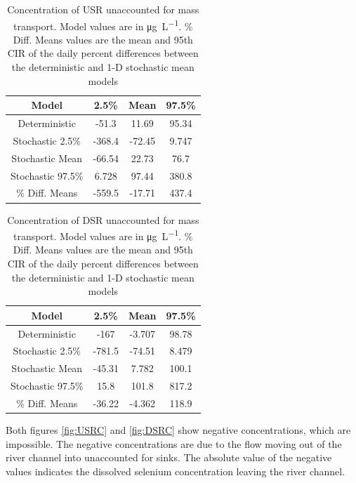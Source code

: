 \begin{linenumbers}
\begin{table}[htbp]
\centering
\caption[Concentration of USR unaccounted for mass transport.]{Concentration of USR unaccounted for mass transport.  Model values are in \si{\micro\gram\per\liter}.  \% Diff. Means values are the mean and 95th CIR of the daily percent differences between the deterministic and 1-D stochastic mean models}
\label{tab:USRUnknownC}
\begin{tabular}{c|ccc}
	\toprule
	Model& 2.5\% & Mean & 97.5\% \\
	\midrule
	\midrule
	Deterministic&		-51.3&	11.69&	95.34\\
	\midrule			                               
	Stochastic 2.5\%&	-368.4&	-72.45&	9.747\\
	Stochastic Mean&	-66.54&	22.73&	76.7\\ 
	Stochastic 97.5\%&	6.728&	97.44&	380.8\\
	\midrule                                           
	\% Diff. Means &	-559.5&	-17.71&	437.4\\
	\bottomrule
\end{tabular}
\end{table}

\begin{table}[htbp]
\centering
\caption[Concentration of DSR unaccounted for mass transport.]{Concentration of DSR unaccounted for mass transport.  Model values are in \si{\micro\gram\per\liter}.  \% Diff. Means values are the mean and 95th CIR of the daily percent differences between the deterministic and 1-D stochastic mean models}
\label{tab:DSRUnknownC}
\begin{tabular}{c|ccc}
	\toprule
	Model& 2.5\% & Mean & 97.5\% \\
	\midrule
	\midrule
	Deterministic&		-167&	-3.707&	98.78\\
	\midrule			                               
	Stochastic 2.5\%&	-781.5&	-74.51&	8.479\\
	Stochastic Mean&	-45.31&	7.782&	100.1\\
	Stochastic 97.5\%&	15.8&	101.8&	817.2\\
	\midrule                                           
	\% Diff. Means &	-36.22&	-4.362&	118.9\\
	\bottomrule
\end{tabular}
\end{table}

Both figures \ref{fig:USRC} and \ref{fig:DSRC} show negative concentrations, which are impossible.  The negative concentrations are due to the flow moving out of the river channel into unaccounted for sinks.  The absolute value of the negative values indicates the dissolved selenium concentration leaving the river channel.
\clearpage


\end{linenumbers}
